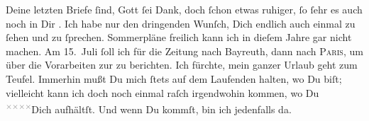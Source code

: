 \pstart
           Deine letzten Briefe{ }ſind, Gott{ }ſei Dank, doch{ }ſchon etwas ruhiger,{ }ſo{ }ſehr es auch
               noch in Dir \label{K_L02876-2v}\label{K_L02876-2}. Ich habe nur den dringenden Wunſch, Dich endlich auch einmal zu{ }ſehen und zu{ }ſprechen. Sommerpläne freilich kann ich in dieſem Jahre gar nicht machen. Am 15. Juli{ }ſoll ich für die Zeitung nach Bayreuth, dann nach \textsc{Paris}, um über die Vorarbeiten zur \label{K_L02876-3v}\label{K_L02876-3} zu berichten. Ich fürchte, mein ganzer Urlaub geht zum Teufel.
               Immerhin mußt Du mich{ }ſtets auf dem Laufenden halten, wo Du biſt; vielleicht kann ich
               doch noch einmal raſch irgendwohin kommen, wo Du \substVorne{}\textsuperscript{\textcolor{gray}{×}\-\textcolor{gray}{×}\-\textcolor{gray}{×}\-\textcolor{gray}{×}}\substDazwischen{}Dich aufhältſt.\substHinten{} Und wenn Du \label{K_L02876-4v}\label{K_L02876-4} kommſt, bin ich
               jedenfalls da.\pend
           

